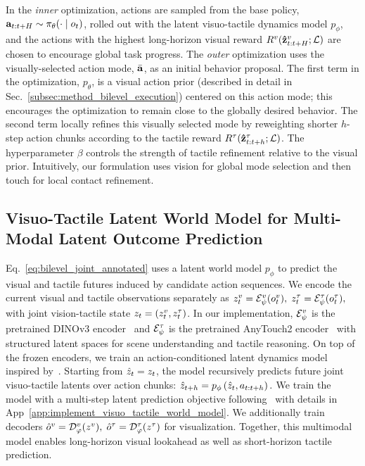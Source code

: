 In the \textit{inner} optimization, actions are sampled from the base policy, $\mathbf{a}_{t:t+H} \sim \pi_\theta(\cdot \mid o_t)$, rolled out with the latent visuo-tactile dynamics model $p_\phi$, and the actions with the highest long-horizon visual reward $R^v(\mathbf{\hat{z}}^{v}_{t:t+H}; \mathcal{L})$ are chosen to encourage global task progress. 
The \textit{outer} optimization uses the visually-selected action mode, $\bar{\mathbf{a}}$, as an initial behavior proposal. 
The first term in the optimization, $p_\theta$, is a visual action prior (described in detail in Sec.~\ref{subsec:method_bilevel_execution}) centered on this action mode; this encourages the optimization to remain close to the globally desired behavior. 
The second term locally refines this visually selected mode by reweighting shorter $h$-step action chunks according to the tactile reward $R^\tau(\mathbf{\hat{z}}^{\tau}_{t:t+h}; \mathcal{L})$. 
The hyperparameter $\beta$ controls the strength of tactile refinement relative to the visual prior. 
Intuitively, our formulation uses vision for global mode selection and then touch for local contact refinement. 






    
\subsection{Visuo-Tactile Latent World Model for Multi-Modal Latent Outcome Prediction}
\label{subsec:method_world_model}

Eq.~\ref{eq:bilevel_joint_annotated} uses a latent world model $p_\phi$ to predict the visual and tactile futures induced by candidate action sequences. 
We encode the current visual and tactile observations separately as
$
    z^{v}_t = \mathcal{E}_\psi^{v}(o^v_t), \;
    z^{\tau}_t = \mathcal{E}_\psi^{\tau}(o^\tau_t), \;
$
with joint vision-tactile state $z_t = (z^{v}_t, z^{\tau}_t)$. In our implementation, $\mathcal{E}_\psi^{v}$ is the pretrained DINOv3 encoder~\cite{simeoni2025dinov3} and $\mathcal{E}_\psi^{\tau}$ is the pretrained AnyTouch2 encoder~\cite{fenganytouch2} with structured latent spaces for scene understanding and tactile reasoning.
On top of the frozen encoders, we train an action-conditioned latent dynamics model inspired by~\cite{zhoudino}. Starting from $\hat{z}_t=z_t$, the model recursively predicts future joint visuo-tactile latents over action chunks:
$    \hat{z}_{t+h}
    =
    p_\phi
    \left(
        \hat{z}_{t},
        a_{t:t+h}
    \right).$
We train the model 
with a multi-step latent prediction objective following~\cite{higuera2026visuo} with details in App~\ref{app:implement_visuo_tactile_world_model}.
We additionally train decoders
$
    \hat{o}^v = \mathcal{D}_\varphi^v(z^{v}), \;
    \hat{o}^\tau = \mathcal{D}_\varphi^\tau(z^{\tau})
$
for visualization.
Together, this multimodal model enables long-horizon visual lookahead as well as short-horizon tactile prediction.


